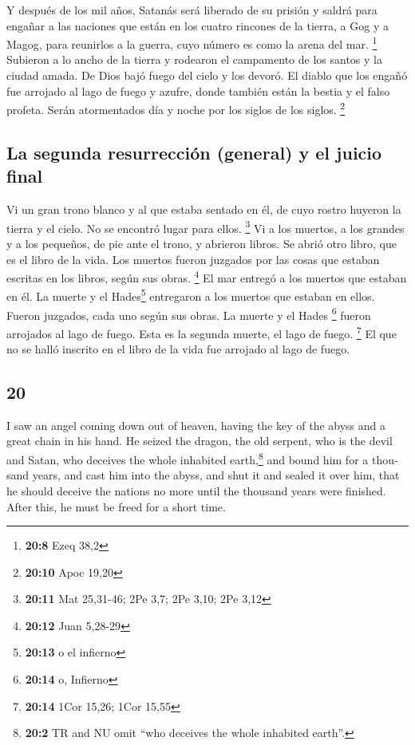\begin{paracol}{2}
 Y después de los mil años, Satanás será liberado de su
prisión  y saldrá para engañar a las naciones que están en
los cuatro rincones de la tierra, a Gog y a Magog, para reunirlos a la
guerra, cuyo número es como la arena del mar. \footnote{\textbf{20:8}
  Ezeq 38,2}  Subieron a lo ancho de la tierra y rodearon
el campamento de los santos y la ciudad amada. De Dios bajó fuego del
cielo y los devoró.  El diablo que los engañó fue
arrojado al lago de fuego y azufre, donde también están la bestia y el
falso profeta. Serán atormentados día y noche por los siglos de los
siglos. \footnote{\textbf{20:10} Apoc 19,20}

\hypertarget{la-segunda-resurrecciuxf3n-general-y-el-juicio-final}{%
\subsection{La segunda resurrección (general) y el juicio
final}\label{la-segunda-resurrecciuxf3n-general-y-el-juicio-final}}

 Vi un gran trono blanco y al que estaba sentado en él,
de cuyo rostro huyeron la tierra y el cielo. No se encontró lugar para
ellos. \footnote{\textbf{20:11} Mat 25,31-46; 2Pe 3,7; 2Pe 3,10; 2Pe
  3,12}  Vi a los muertos, a los grandes y a los
pequeños, de pie ante el trono, y abrieron libros. Se abrió otro libro,
que es el libro de la vida. Los muertos fueron juzgados por las cosas
que estaban escritas en los libros, según sus obras. \footnote{\textbf{20:12}
  Juan 5,28-29}  El mar entregó a los muertos que estaban
en él. La muerte y el Hades\footnote{\textbf{20:13} o el infierno}
entregaron a los muertos que estaban en ellos. Fueron juzgados, cada uno
según sus obras.  La muerte y el Hades \footnote{\textbf{20:14}
  o, Infierno} fueron arrojados al lago de fuego. Esta es la segunda
muerte, el lago de fuego. \footnote{\textbf{20:14} 1Cor 15,26; 1Cor
  15,55}  El que no se halló inscrito en el libro de la
vida fue arrojado al lago de fuego.

\switchcolumn
\begin{otherlanguage}{english}

\hypertarget{section-39}{%
\section{20}\label{section-39}}

 I saw an angel coming down out of heaven, having the key
of the abyss and a great chain in his hand.  He seized the
dragon, the old serpent, who is the devil and Satan, who deceives the
whole inhabited earth,\footnote{\textbf{20:2} TR and NU omit ``who
  deceives the whole inhabited earth''.} and bound him for a thousand
years,  and cast him into the abyss, and shut it and
sealed it over him, that he should deceive the nations no more until the
thousand years were finished. After this, he must be freed for a short
time.


\end{otherlanguage}
\end{paracol}
